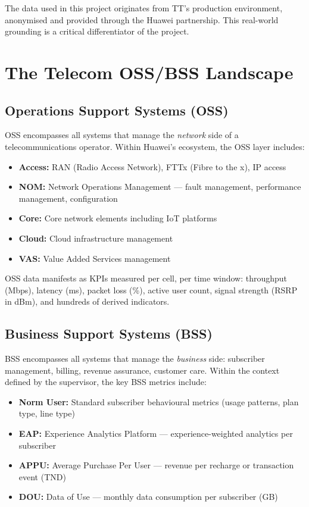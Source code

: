 The data used in this project originates from TT's production environment, anonymised and provided through the Huawei partnership. This real-world grounding is a critical differentiator of the project.

\section{The Telecom OSS/BSS Landscape}

\subsection{Operations Support Systems (OSS)}

OSS encompasses all systems that manage the \emph{network} side of a telecommunications operator. Within Huawei's ecosystem, the OSS layer includes:

\begin{itemize}
  \item \textbf{Access:} RAN (Radio Access Network), FTTx (Fibre to the x), IP access
  \item \textbf{NOM:} Network Operations Management --- fault management, performance management, configuration
  \item \textbf{Core:} Core network elements including IoT platforms
  \item \textbf{Cloud:} Cloud infrastructure management
  \item \textbf{VAS:} Value Added Services management
\end{itemize}

OSS data manifests as KPIs measured per cell, per time window: throughput (Mbps), latency (ms), packet loss (\%), active user count, signal strength (RSRP in dBm), and hundreds of derived indicators.

\subsection{Business Support Systems (BSS)}

BSS encompasses all systems that manage the \emph{business} side: subscriber management, billing, revenue assurance, customer care. Within the context defined by the supervisor, the key BSS metrics include:

\begin{itemize}
  \item \textbf{Norm User:} Standard subscriber behavioural metrics (usage patterns, plan type, line type)
  \item \textbf{EAP:} Experience Analytics Platform --- experience-weighted analytics per subscriber
  \item \textbf{APPU:} Average Purchase Per User --- revenue per recharge or transaction event (TND)
  \item \textbf{DOU:} Data of Use --- monthly data consumption per subscriber (GB)
\end{itemize}


